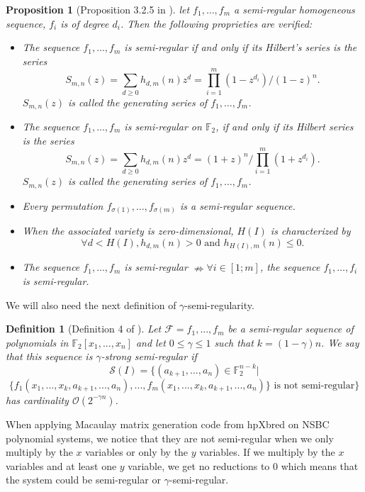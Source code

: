 \documentclass[english]{article}
\newtheorem{proposition}{Proposition}[section]
\newtheorem{definition}{Definition}[section]
\begin{document}
		\begin{proposition}[Proposition 3.2.5 in \cite{Bardet04}]\label{PropSemi}
			let $f_1,\dots,f_m$ a semi-regular homogeneous sequence, $f_i$ is of degree $d_i$. Then the following proprieties are verified:
			\begin{itemize}
				\item The sequence $f_1,\dots,f_m$ is semi-regular if and only if its Hilbert's series is the series $$S_{m, n}(z) = \sum_{d \geq 0}h_{d, m}(n)z^d = \prod_{i=1}^{m}(1-z^{d_i})/(1-z)^n.$$ $S_{m, n}(z)$ is called the generating series of $f_1,\dots,f_m$.
				\item The sequence $f_1,\dots,f_m$ is semi-regular on $\mathbb{F}_2$, if and only if its Hilbert series is the series $$S_{m, n}(z) = \sum_{d \geq 0}h_{d, m}(n)z^d = (1+z)^n/\prod_{i=1}^{m}(1+z^{d_i}).$$ $S_{m, n}(z)$ is called the generating series of $f_1,\dots,f_m$.
				\item Every permutation $f_{\sigma(1)},\dots,f_{\sigma(m)}$ is a semi-regular sequence.
				\item When the associated variety is zero-dimensional, $H(I)$ is characterized by
				$$
				\forall d < H(I), h_{d, m}(n) > 0 \text{ and } h_{H(I), m}(n) \leq 0.
				$$
				\item The sequence $f_1,\dots,f_m$ is semi-regular $\nRightarrow \forall i \in [1;m]$, the sequence $f_1,\dots,f_i$ is semi-regular. 
			\end{itemize}
		\end{proposition}
		
		We will also need the next definition of $\gamma$-semi-regularity.
		
		 \begin{definition}[Definition 4 of \cite{VID24}]
			Let $\mathcal{F} = {f_1,...,f_m}$ be a semi-regular sequence of polynomials in $\mathbb{F}_2[x_1,...,x_n]$ and let $0 \leq \gamma \leq 1$ such that $k = (1 - \gamma)n$. We say that this sequence is $\gamma$-strong semi-regular if
			$$
			\mathcal{S}(I) = \{(a_{k+1},...,a_n) \in \mathbb{F}_{2}^{n-k} |
			$$
			$$
			\{f_1(x_1,...,x_k,a_{k+1},...,a_n),...,f_m(x_1,...,x_k,a_{k+1},...,a_n)\} \text{ is not semi-regular}\}
			$$
			has cardinality $\mathcal{O}(2^{-\gamma n})$.
		\end{definition}
		
		When applying Macaulay matrix generation code from hpXbred \cite{BS23} on NSBC polynomial systems, we notice that they are not semi-regular when we only multiply by the $x$ variables or only by the $y$ variables. If we multiply by the $x$ variables and at least one $y$ variable, we get no reductions to 0 which means that the system could be semi-regular or $\gamma$-semi-regular.
		
\end{document}
